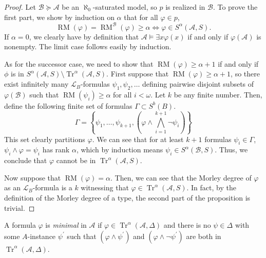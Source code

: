 \documentclass{article}
\DeclareMathOperator{\Tr}{Tr}
\DeclareMathOperator{\RM}{RM}
\let\mc\mathcal
\begin{document}
\begin{proof}
    Let $\mc{B} \succeq \mc{A}$ be an $\aleph_0$-saturated model, so $p$ is realized in $\mc{B}$. To prove the first part, we show by induction on $\alpha$ that for all $\varphi \in p$,
    \[ \RM(\varphi) = \RM^{\mc{B}}(\varphi) \geq \alpha \Leftrightarrow \varphi \in S^{\alpha}(\mc{A}, S). \]
    If $\alpha = 0$, we clearly have by definition that $\mc{A} \vDash \exists x \varphi(x)$ if and only if $\varphi(\mc{A})$ is nonempty. The limit case follows easily by induction.

    As for the successor case, we need to show that $\RM(\varphi) \geq \alpha + 1$ if and only if $\phi$ is in $S^{\alpha}(\mc{A}, S) \setminus \Tr^{\alpha}(\mc{A}, S)$. First suppose that $\RM(\varphi) \geq \alpha + 1$, so there exist infinitely many $\mc{L}_B$-formulas $\psi_1, \psi_2, \ldots$ defining pairwise disjoint subsets of $\varphi(\mc{B})$ such that $\RM(\psi_i) \geq \alpha$ for all $i < \omega$. Let $k$ be any finite number. Then, define the following finite set of formulas $\Gamma \subset S^b(B)$.
    \[ \Gamma = \left\{ \psi_1, \ldots, \psi_{k+1}, \left( \varphi \land \bigwedge_{i=1}^{k+1} \neg \psi_i \right) \right\} \]
    This set clearly partitions $\varphi$. We can see that for at least $k+1$ formulas $\psi_i \in \Gamma$, $\psi_i \land \varphi = \psi_i$ has rank $\alpha$, which by induction means $\psi_i \in S^{\alpha}(\mc{B}, S)$. Thus, we conclude that $\varphi$ cannot be in $\Tr^{\alpha}(\mc{A}, S)$.

    Now suppose that $\RM(\varphi) = \alpha$. Then, we can see that the Morley degree of $\varphi$ as an $\mc{L}_B$-formula is a $k$ witnessing that $\varphi \in \Tr^{\alpha}(\mc{A}, S)$. In fact, by the definition of the Morley degree of a type, the second part of the proposition is trivial.
\end{proof}

\begin{definition}[Minimality]
    A formula $\varphi$ is \textit{minimal} in $\mc{A}$ if $\varphi \in \Tr^{\alpha}(\mc{A}, \Delta)$ and there is no $\psi \in \Delta$ with some $A$-instance $\psi^{\prime}$ such that $(\varphi \land \psi^{\prime})$ and $(\varphi \land \neg \psi^{\prime})$ are both in $\Tr^{\alpha}(\mc{A}, \Delta)$.
\end{definition}
\end{document}
